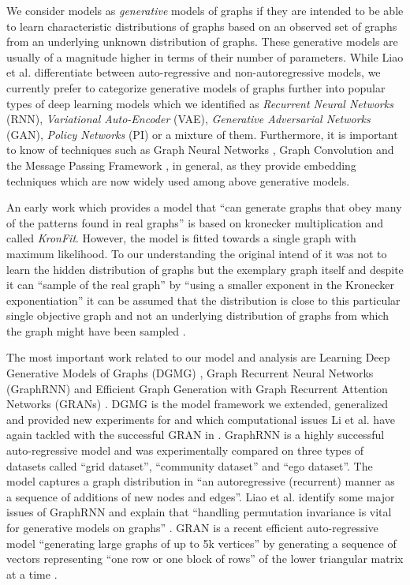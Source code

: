 \documentclass{article}
\begin{document}
We consider models as \textit{generative} models of graphs if they are intended to be able to learn characteristic distributions of graphs based on an observed set of graphs from an underlying unknown distribution of graphs.
These generative models are usually of a magnitude higher in terms of their number of parameters.
While Liao et al. \cite{liao2019efficient} differentiate between auto-regressive and non-autoregressive models, we currently prefer to categorize generative models of graphs further into popular types of deep learning models which we identified as \textit{Recurrent Neural Networks} (RNN), \textit{Variational Auto-Encoder} (VAE), \textit{Generative Adversarial Networks} (GAN), \textit{Policy Networks} (PI) or a mixture of them.
Furthermore, it is important to know of techniques such as Graph Neural Networks \cite{gori2005new}, Graph Convolution \cite{kipf2016semi} and the Message Passing Framework \cite{gilmer2017neural}, in general, as they provide embedding techniques which are now widely used among above generative models.

An early work which provides a model that ``can generate graphs that obey many of the patterns found in real graphs'' is based on kronecker multiplication \cite{leskovec2007scalable} and called \textit{KronFit}.
However, the model is fitted towards a single graph with maximum likelihood.
To our understanding the original intend of it was not to learn the hidden distribution of graphs but the exemplary graph itself and despite it can ``sample of the real graph'' by ``using a smaller exponent in the Kronecker exponentiation'' it can be assumed that the distribution is close to this particular single objective graph and not an underlying distribution of graphs from which the graph might have been sampled \cite{leskovec2010kronecker}.

The most important work related to our model and analysis are Learning Deep Generative Models of Graphs (DGMG) \cite{li2018learning}, Graph Recurrent Neural Networks (GraphRNN) \cite{you2018graphrnn} and Efficient Graph Generation with Graph Recurrent Attention Networks (GRANs) \cite{liao2019efficient}.
DGMG is the model framework we extended, generalized and provided new experiments for and which computational issues Li et al. have again tackled with the successful GRAN in \cite{liao2019efficient}.
GraphRNN \cite{you2018graphrnn} is a highly successful auto-regressive model and was experimentally compared on three types of datasets called ``grid dataset'', ``community dataset'' and ``ego dataset''.
The model captures a graph distribution in ``an autoregressive (recurrent) manner as a sequence of additions of new nodes and edges''.
Liao et al. identify some major issues of GraphRNN and explain that ``handling permutation invariance is vital for generative models
on graphs'' \cite{liao2019efficient}.
GRAN is a recent efficient auto-regressive model ``generating large graphs of up to 5k vertices'' by generating a sequence of vectors representing ``one row or one block of rows'' of the lower triangular matrix at a time \cite{liao2019efficient}.
\end{document}
